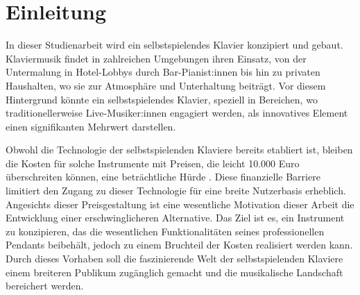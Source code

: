\chapter{Einleitung} \label{einleitung}

\nocite{*}

In dieser Studienarbeit wird ein selbstspielendes Klavier konzipiert und gebaut.
Klaviermusik findet in zahlreichen Umgebungen ihren Einsatz, von der Untermalung in Hotel-Lobbys durch Bar-Pianist:innen bis hin zu privaten Haushalten,
wo sie zur Atmosphäre und Unterhaltung beiträgt.
Vor diesem Hintergrund könnte ein selbstspielendes Klavier, speziell in Bereichen, wo traditionellerweise Live-Musiker:innen engagiert werden,
als innovatives Element einen signifikanten Mehrwert darstellen.

Obwohl die Technologie der selbstspielenden Klaviere bereits etabliert ist, bleiben die Kosten für solche Instrumente mit Preisen,
die leicht 10.000 Euro überschreiten können, eine beträchtliche Hürde \cite*{YamahaU1}.
Diese finanzielle Barriere limitiert den Zugang zu dieser Technologie für eine breite Nutzerbasis erheblich.
Angesichts dieser Preisgestaltung ist eine wesentliche Motivation dieser Arbeit die Entwicklung einer erschwinglicheren Alternative. %
Das Ziel ist es, ein Instrument zu konzipieren, das die wesentlichen Funktionalitäten seines professionellen Pendants beibehält,
jedoch zu einem Bruchteil der Kosten realisiert werden kann.
Durch dieses Vorhaben soll die faszinierende Welt der selbstspielenden Klaviere einem breiteren Publikum zugänglich gemacht und die musikalische Landschaft bereichert werden.



